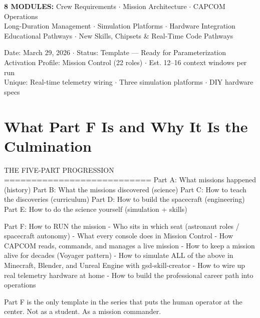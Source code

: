 \documentclass[11pt,letterpaper]{article}
\begin{document}
\begin{center}
\vspace{1cm}
\begin{center}
\colorbox{lightprimary}{\parbox{14cm}{\centering\small\sffamily\textcolor{primary}{%
\textbf{8 MODULES:} Crew Requirements $\cdot$ Mission Architecture $\cdot$ CAPCOM Operations\\[0.2em]
Long-Duration Management $\cdot$ Simulation Platforms $\cdot$ Hardware Integration\\[0.2em]
Educational Pathways $\cdot$ New Skills, Chipsets \& Real-Time Code Pathways
}}}
\end{center}

\vspace{1.2cm}
{\small\sffamily\textcolor{subtlegray}{Date: March 29, 2026 $\cdot$ Status: Template --- Ready for Parameterization}}\\[0.2em]
{\small\sffamily\textcolor{subtlegray}{Activation Profile: Mission Control (22 roles) $\cdot$ Est. 12--16 context windows per run}}\\[0.2em]
{\small\sffamily\textcolor{subtlegray}{Unique: Real-time telemetry wiring $\cdot$ Three simulation platforms $\cdot$ DIY hardware specs}}
\end{center}
\newpage

\thispagestyle{fancy}
\section*{What Part F Is and Why It Is the Culmination}

\begin{asciibox}
THE FIVE-PART PROGRESSION
===========================
Part A: What missions happened (history)
Part B: What the missions discovered (science)
Part C: How to teach the discoveries (curriculum)
Part D: How to build the spacecraft (engineering)
Part E: How to do the science yourself (simulation + skills)

Part F: How to RUN the mission
  - Who sits in which seat (astronaut roles / spacecraft autonomy)
  - What every console does in Mission Control
  - How CAPCOM reads, commands, and manages a live mission
  - How to keep a mission alive for decades (Voyager pattern)
  - How to simulate ALL of the above in Minecraft, Blender,
    and Unreal Engine with gsd-skill-creator
  - How to wire up real telemetry hardware at home
  - How to build the professional career path into operations

Part F is the only template in the series that puts the human
operator at the center. Not as a student. As a mission commander.
\end{asciibox}
\end{document}
